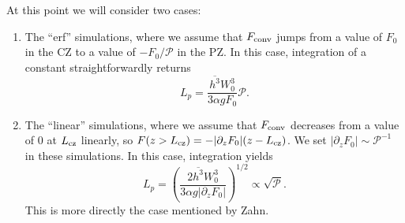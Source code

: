\documentclass[12pt]{article}
\begin{document}
At this point we will consider two cases:
\begin{enumerate}
\item The ``erf'' simulations, where we assume that $F_{\rm{conv}}$ jumps from a value of $F_0$ in the CZ to a value of $-F_0/\mathcal{P}$ in the PZ.
In this case, integration of a constant straightforwardly returns
\begin{equation}
L_p = \frac{\overline{h^3} W_0^3}{3\alpha g F_0}\mathcal{P}.
\end{equation}
\item The ``linear'' simulations, where we assume that $F_{\rm{conv}}$ decreases from a value of 0 at $L_{\rm{cz}}$ linearly, so $F(z > L_{\rm{cz}}) = -|\partial_z F_0|(z - L_{\rm{cz}})$.
We set $|\partial_z F_0| \sim \mathcal{P}^{-1}$ in these simulations.
In this case, integration yields
\begin{equation}
L_p = \left(\frac{2\overline{h^3} W_0^3}{3\alpha g|\partial_z F_0|}\right)^{1/2} \propto \sqrt{\mathcal{P}}.
\end{equation}
This is more directly the case mentioned by Zahn.
\end{enumerate}
\end{document}
